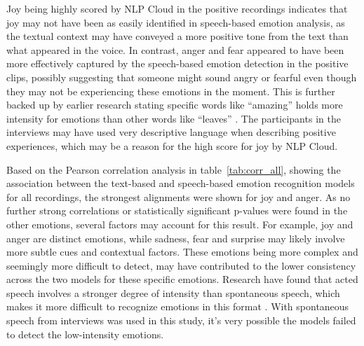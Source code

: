 Joy being highly scored by NLP Cloud in the positive recordings indicates that joy may not have been as easily identified in speech-based emotion analysis, as the textual context may have conveyed a more positive tone from the text than what appeared in the voice. In contrast, anger and fear appeared to have been more effectively captured by the speech-based emotion detection in the positive clips, possibly suggesting that someone might sound angry or fearful even though they may not be experiencing these emotions in the moment. This is further backed up by earlier research stating specific words like “amazing” holds more intensity for emotions than other words like “leaves” \autocite{Chauhan2024}. The participants in the interviews may have used very descriptive language when describing positive experiences, which may be a reason for the high score for joy by NLP Cloud.

Based on the Pearson correlation analysis in table~\ref{tab:corr_all}, showing the association between the text-based and speech-based emotion recognition models for all recordings, the strongest alignments were shown for joy and anger. As no further strong correlations or statistically significant p-values were found in the other emotions, several factors may account for this result. For example, joy and anger are distinct emotions, while sadness, fear and surprise may likely involve more subtle cues and contextual factors. These emotions being more complex and seemingly more difficult to detect, may have contributed to the lower consistency across the two models for these specific emotions. Research have found that acted speech involves a stronger degree of intensity than spontaneous speech, which makes it more difficult to recognize emotions in this format \autocite{Chakraborty2016}. With spontaneous speech from interviews was used in this study, it’s very possible the models failed to detect the low-intensity emotions.

